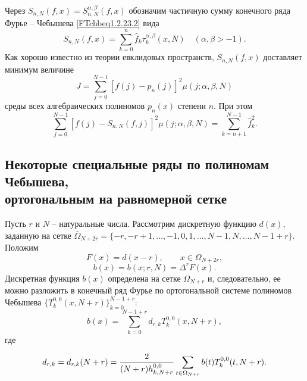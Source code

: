 Через $S_{n,N}(f,x)=S_{n,N}^{\alpha,\beta}(f,x)$ обозначим частичную сумму конечного ряда Фурье -- Чебышева \eqref{FTchbeq1.2.23.2} вида
 \begin{equation}\label{FTchbeq1.2.23.7}
S_{n,N}(f,x)=\sum_{k=0}^{n}\hat f_k\tau_k^{\alpha,\beta}(x,N)\quad (\alpha,\beta>-1).
    \end{equation}
Как хорошо известно из теории евклидовых пространств, $S_{n,N}(f,x)$ доставляет минимум величине
$$
J=\sum_{j=0}^{N-1}[f(j)-p_n(j)]^2\mu(j;\alpha,\beta,N)
$$
среды   всех алгебраических полиномов $p_n(x)$ степени $n$.  При этом
\begin{equation}\label{FTchbeq1.2.23.8}
\sum_{j=0}^{N-1}[f(j)-S_{n,N}(f,j)]^2\mu(j;\alpha,\beta,N)=\sum_{k=n+1}^{N-1}\hat f_k^2.
\end{equation}

\subsection{Некоторые специальные ряды по полиномам Чебышева,\\
 ортогональным на равномерной сетке }


     Пусть $r$ и $N$ -- натуральные числа. Рассмотрим дискретную
     функцию $d(x)$, заданную на сетке $\bar \Omega_{N+2r}=
\{-r,-r+1,\ldots,-1,0,1,\ldots,N-1,N,\ldots,N-1+r\}$.
     Положим
   \begin{equation}\label{sTpseq1.2.24.1}
F(x)=d(x-r),\qquad x\in \Omega_{N+2r},
 \end{equation}
     \begin{equation}\label{sTpseq1.2.24.2}
     b(x)=b(x;r,N)=\Delta^rF(x).
     \end{equation}
Дискретная функция  $b(x)$ определена на сетке $\Omega_{N+r}$ и,
     следовательно, ее можно разложить в конечный ряд Фурье
по ортогональной системе полиномов Чебышева
$\{T_k^{0,0}(x,N+r)\}_{k=0}^{N-1+r}$:
     \begin{equation}\label{sTpseq1.2.24.3}
 b(x)=\sum_{k=0}^{N-1+r}d_{r,k}T_k^{0,0}(x,N+r),
     \end{equation}
  где

  \begin{equation}\label{sTpseq1.2.24.4}
 d_{r,k}    =d_{r,k}(N+r)={2\over (N+r)h_{k,N+r}^{0,0}}
     \sum_{t\in\Omega_{N+r}}b(t)T_k^{0,0}(t,N+r).
    \end{equation}

